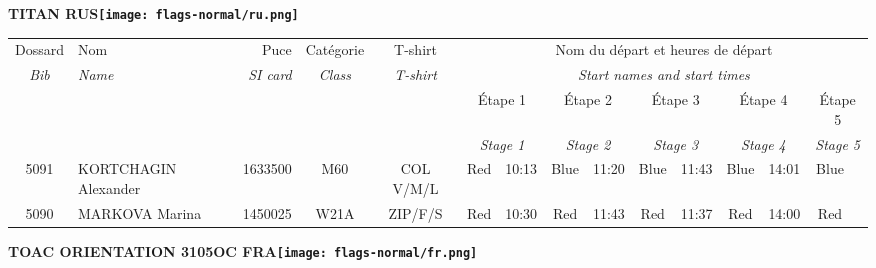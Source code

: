 \documentclass{report}
\begin{document}
\newpage
  \Huge \centering \bfseries TITAN  RUS\normalfont \footnotesize \sffamily \hfill \texttt{[image: flags-normal/ru.png]} \newline 
  \begin{longtable}{|c|l|r|c|c|*{5}{cc|}}
    Dossard & Nom  & Puce    & Catégorie & T-shirt & \multicolumn{10}{c|}{Nom du départ et heures de départ} \\
    \itshape Bib     & \itshape Name & \itshape SI card & \itshape Class  & \itshape  T-shirt  & \multicolumn{10}{c|}{\itshape Start names and start times} \\
    \hline
    & & & & & \multicolumn{2}{c|}{Étape 1} & \multicolumn{2}{c|}{Étape 2} & \multicolumn{2}{c|}{Étape 3} & \multicolumn{2}{c|}{Étape 4} & \multicolumn{2}{c|}{Étape 5} \\
    & & & & & \multicolumn{2}{c|}{\itshape Stage 1} & \multicolumn{2}{c|}{\itshape Stage 2} & \multicolumn{2}{c|}{\itshape Stage 3} & \multicolumn{2}{c|}{\itshape Stage 4} & \multicolumn{2}{c|}{\itshape Stage 5} \\
    \hline
    5091 & KORTCHAGIN Alexander & 1633500 & M60 & COL V/M/L & Red & 10:13 & Blue & 11:20 & Blue & 11:43 & Blue & 14:01 & Blue &  \\
    5090 & MARKOVA Marina & 1450025 & W21A & ZIP/F/S & Red & 10:30 & Red & 11:43 & Red & 11:37 & Red & 14:00 & Red &  \\
  \end{longtable}
\newpage
  \Huge \centering \bfseries TOAC ORIENTATION 3105OC FRA\normalfont \footnotesize \sffamily \hfill \texttt{[image: flags-normal/fr.png]} \newline 
\end{document}
